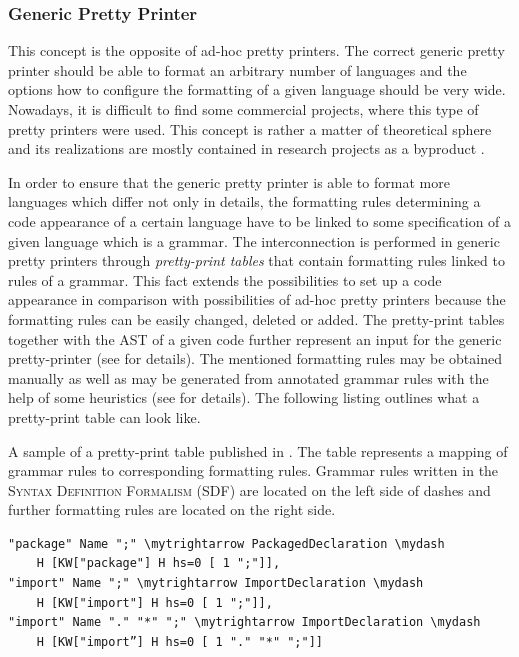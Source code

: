\documentclass[12pt,notitlepage,a4paper]{report}
\begin{document}
\subsubsection {Generic Pretty Printer}
This concept is the opposite of ad-hoc pretty printers. The correct generic pretty printer should be able to format an arbitrary number of languages and the options how to configure the formatting of a given language should be very wide. Nowadays, it is difficult to find some commercial projects, where this type of pretty printers were used. This concept is rather a matter of theoretical sphere and its realizations are mostly contained in research projects as a byproduct \cite{StrategoXT, PPML, Brand-Visser, DeJonge, OCaml}.

In order to  ensure that the generic pretty printer is able to format more languages which differ not only in details, the formatting rules determining a code appearance of a certain language have to be linked to some specification of a given language which is a grammar. The interconnection is performed in generic pretty printers through \textit{pretty-print tables} that contain formatting rules linked to rules of a grammar. This fact extends the possibilities to set up a code appearance in comparison with possibilities of ad-hoc pretty printers because the formatting rules can be easily changed, deleted or added. The pretty-print tables together with the AST of a given code further represent an input for the generic pretty-printer (see \cite{DeJonge} for details). The mentioned formatting rules may be obtained manually as well as may be generated from annotated grammar rules with the help of some heuristics (see \cite{DeJonge} for details). The following listing outlines what a pretty-print table can look like.

\newcommand{\mytrightarrow}{$\rightarrow$}
\newcommand{\mydash}{$-$}
\begin{expl}\label{PrettyPrintTable}
A sample of a pretty-print table published in \cite{DeJonge}. The table represents a mapping of grammar rules to corresponding formatting rules.  Grammar rules written in the \textsc{Syntax Definition Formalism (SDF)} \cite{SDF} are located  on the left side of dashes and further formatting rules are located on the right side. 
\begingroup
\fontsize{10pt}{12pt}
\begin{Verbatim}[commandchars=\\\{\}]
"package" Name ";" \mytrightarrow PackagedDeclaration \mydash
    H [KW["package"] H hs=0 [ 1 ";"]],
"import" Name ";" \mytrightarrow ImportDeclaration \mydash
    H [KW["import"] H hs=0 [ 1 ";"]],
"import" Name "." "*" ";" \mytrightarrow ImportDeclaration \mydash
    H [KW["import”] H hs=0 [ 1 "." "*" ";"]]
\end{Verbatim}
\endgroup
\end{expl}
\end{document}
